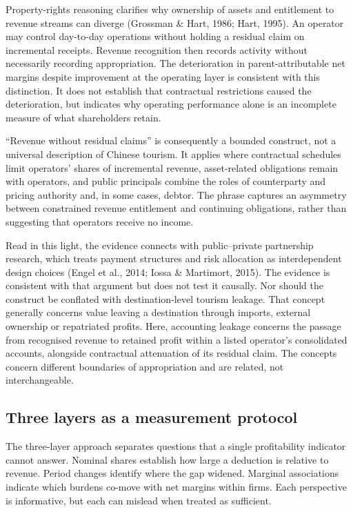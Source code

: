 \documentclass[review,3p,times]{elsarticle}
\begin{document}
Property-rights reasoning clarifies why ownership of assets and entitlement to revenue streams can diverge (Grossman \& Hart, 1986; Hart, 1995). An operator may control day-to-day operations without holding a residual claim on incremental receipts. Revenue recognition then records activity without necessarily recording appropriation. The deterioration in parent-attributable net margins despite improvement at the operating layer is consistent with this distinction. It does not establish that contractual restrictions caused the deterioration, but indicates why operating performance alone is an incomplete measure of what shareholders retain.

``Revenue without residual claims'' is consequently a bounded construct, not a universal description of Chinese tourism. It applies where contractual schedules limit operators' shares of incremental revenue, asset-related obligations remain with operators, and public principals combine the roles of counterparty and pricing authority and, in some cases, debtor. The phrase captures an asymmetry between constrained revenue entitlement and continuing obligations, rather than suggesting that operators receive no income.

Read in this light, the evidence connects with public--private partnership research, which treats payment structures and risk allocation as interdependent design choices (Engel et al., 2014; Iossa \& Martimort, 2015). The evidence is consistent with that argument but does not test it causally. Nor should the construct be conflated with destination-level tourism leakage. That concept generally concerns value leaving a destination through imports, external ownership or repatriated profits. Here, accounting leakage concerns the passage from recognised revenue to retained profit within a listed operator's consolidated accounts, alongside contractual attenuation of its residual claim. The concepts concern different boundaries of appropriation and are related, not interchangeable.

\subsection{Three layers as a measurement protocol}

The three-layer approach separates questions that a single profitability indicator cannot answer. Nominal shares establish how large a deduction is relative to revenue. Period changes identify where the gap widened. Marginal associations indicate which burdens co-move with net margins within firms. Each perspective is informative, but each can mislead when treated as sufficient.
\end{document}
